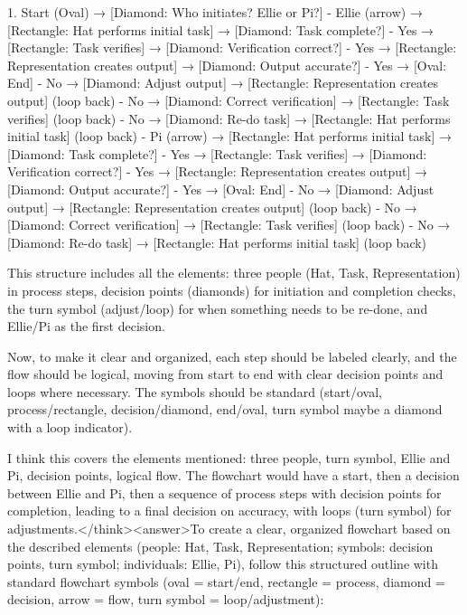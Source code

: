 1. Start (Oval) → [Diamond: Who initiates? Ellie or Pi?]
   - Ellie (arrow) → [Rectangle: Hat performs initial task] → [Diamond: Task complete?]
     - Yes → [Rectangle: Task verifies] → [Diamond: Verification correct?]
       - Yes → [Rectangle: Representation creates output] → [Diamond: Output accurate?]
         - Yes → [Oval: End]
         - No → [Diamond: Adjust output] → [Rectangle: Representation creates output] (loop back)
       - No → [Diamond: Correct verification] → [Rectangle: Task verifies] (loop back)
     - No → [Diamond: Re-do task] → [Rectangle: Hat performs initial task] (loop back)
   - Pi (arrow) → [Rectangle: Hat performs initial task] → [Diamond: Task complete?]
     - Yes → [Rectangle: Task verifies] → [Diamond: Verification correct?]
       - Yes → [Rectangle: Representation creates output] → [Diamond: Output accurate?]
         - Yes → [Oval: End]
         - No → [Diamond: Adjust output] → [Rectangle: Representation creates output] (loop back)
       - No → [Diamond: Correct verification] → [Rectangle: Task verifies] (loop back)
     - No → [Diamond: Re-do task] → [Rectangle: Hat performs initial task] (loop back)

This structure includes all the elements: three people (Hat, Task, Representation) in process steps, decision points (diamonds) for initiation and completion checks, the turn symbol (adjust/loop) for when something needs to be re-done, and Ellie/Pi as the first decision. 

Now, to make it clear and organized, each step should be labeled clearly, and the flow should be logical, moving from start to end with clear decision points and loops where necessary. The symbols should be standard (start/oval, process/rectangle, decision/diamond, end/oval, turn symbol maybe a diamond with a loop indicator). 

I think this covers the elements mentioned: three people, turn symbol, Ellie and Pi, decision points, logical flow. The flowchart would have a start, then a decision between Ellie and Pi, then a sequence of process steps with decision points for completion, leading to a final decision on accuracy, with loops (turn symbol) for adjustments.</think><answer>To create a clear, organized flowchart based on the described elements (people: Hat, Task, Representation; symbols: decision points, turn symbol; individuals: Ellie, Pi), follow this structured outline with standard flowchart symbols (oval = start/end, rectangle = process, diamond = decision, arrow = flow, turn symbol = loop/adjustment):  



